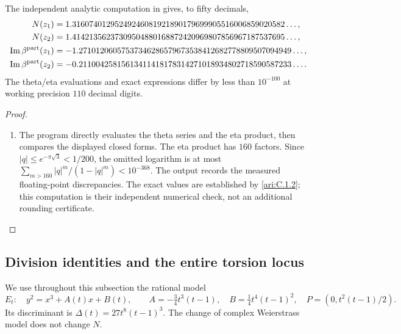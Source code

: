 \begin{proposition}\hypertarget{tag-000K}{}\label{ari:C.1.3}

The independent analytic computation in
 gives, to fifty decimals,
\begin{align*}
 N(z_1)&=1.31607401295249246081921890179699905516006859020582\ldots,\\
 N(z_2)&=1.41421356237309504880168872420969807856967187537695\ldots,\\
 \operatorname{Im}\beta^{\rm part}(z_1)
  &=-1.27101206057537346286579673538412682778809507094949\ldots,\\
 \operatorname{Im}\beta^{\rm part}(z_2)
  &=-0.21100425815613411418178314271018934802718590587233\ldots.
\end{align*}
The theta/eta evaluations and exact expressions differ by less than
$10^{-100}$ at working precision $110$ decimal digits.
\end{proposition}


\begin{proof}
\begin{enumerate}[label=\arabic*.,leftmargin=*]
\item The program directly evaluates the theta series and the eta product,
then compares the displayed closed forms. The eta product has $160$
factors. Since $|q|\le e^{-\pi\sqrt3}<1/200$, the omitted logarithm is
at most $\sum_{m>160}|q|^m/(1-|q|^m)<10^{-368}$.
The output records the measured floating-point discrepancies. The
exact values are established by \ref{ari:C.1.2}; this computation is their
independent numerical check, not an additional rounding certificate.
\end{enumerate}
\end{proof}


\subsection{Division identities and the entire torsion locus}
We use throughout this subsection the rational model
\[
 E_t:\quad y^2=x^3+A(t)x+B(t),\qquad
 A=-\tfrac34t^3(t-1),\quad B=\tfrac14t^4(t-1)^2,
 \quad P=(0,t^2(t-1)/2).
\]
Its discriminant is $\Delta(t)=27t^8(t-1)^3$.
The change of complex Weierstrass model does not change $N$.

